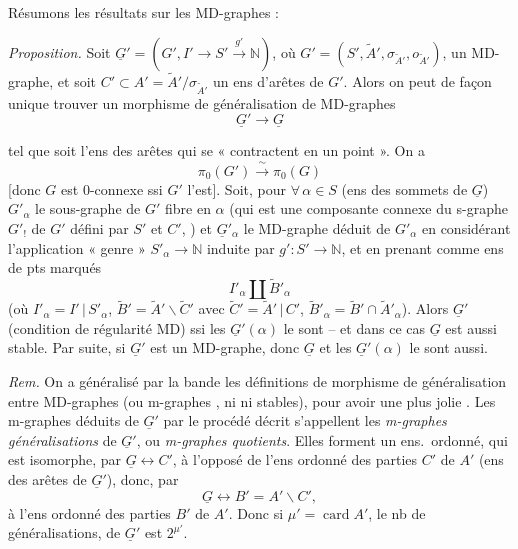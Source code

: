 \documentclass[11pt,a4paper]{article}
\begin{document}
Résumons les résultats sur les MD-graphes :

\emph{Proposition.} Soit $\underline{G}' = (G', I' \to S' \xrightarrow{g'} \mathbb{N})$, où $G' = (S', \widetilde{A}', \sigma_{\widetilde{A}'}, o_{\widetilde{A}'})$, un MD-graphe, et soit $C' \subset A' = \widetilde{A}'/\sigma_{\widetilde{A}'}$ un ens d'arêtes de $G'$. Alors on peut de façon unique \struck{\ill{}}  trouver un morphisme de généralisation de MD-graphes
\[
\underline{G}' \longrightarrow \underline{G}
\]

tel que  soit l'ens des arêtes  qui se « contractent en un point ». On a
\[
\pi_0(G') \xrightarrow{\ \sim\ } \pi_0(G)
\]
[donc $G$ est $0$-connexe ssi $G'$ l'est].  Soit, pour $\forall\, \alpha \in S$ (ens des sommets de $\underline{G}$) $G'_\alpha$ le sous-graphe de $G'$ fibre en $\alpha$ (qui est une composante connexe du s-graphe $G'_{!}$ de $G'$ défini par $S'$ et $C'$, \struck{\ill{}}) et $\underline{G}'_\alpha$ le MD-graphe déduit de $G'_\alpha$ en considérant l'application « genre » $S'_\alpha \to \mathbb{N}$ induite par $g' : S' \to \mathbb{N}$, et en prenant comme ens de pts marqués
\[
I'_\alpha \amalg \widetilde{B}'_\alpha
\]
(où $I'_\alpha = I' \,|\, S'_\alpha$, $\widetilde{B}' = \widetilde{A}' \smallsetminus \widetilde{C}'$ avec $\widetilde{C}' = \widetilde{A}' \,|\, C'$, $\widetilde{B}'_\alpha = \widetilde{B}' \cap \widetilde{A}'_\alpha$). Alors $\underline{G}'$   (condition de régularité MD) ssi les $\underline{G}'(\alpha)$ le sont -- et dans ce cas $\underline{G}$ est aussi stable. Par suite, si $\underline{G}'$ est un MD-graphe, donc $\underline{G}$ et les $\underline{G}'(\alpha)$ le sont aussi.

\emph{Rem.} On a généralisé par la bande les définitions de morphisme de généralisation entre MD-graphes (ou m-graphes , ni  ni stables), pour avoir une plus jolie . Les m-graphes déduits de $\underline{G}'$ par le procédé décrit s'appellent les \emph{m-graphes généralisations} de $\underline{G}'$, ou \emph{m-graphes quotients}. Elles forment un ens.\ ordonné, qui est isomorphe, par $\underline{G} \longleftrightarrow C'$, à l'opposé de l'ens ordonné des parties $C'$ de $A'$ (ens des arêtes de $\underline{G}'$), donc, par
\[
\underline{G} \longleftrightarrow B' = A' \smallsetminus C',
\]
à l'ens ordonné des parties $B'$ de $A'$. Donc si $\mu' = \operatorname{card} A'$, le nb de généralisations, de $\underline{G}'$ est $2^{\mu'}$.
\end{document}
